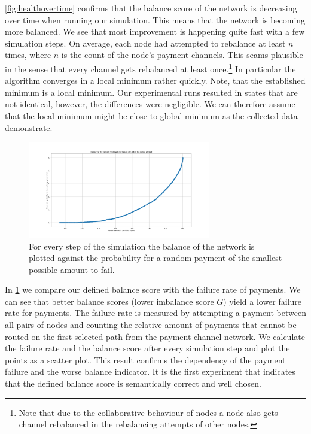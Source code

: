 \documentclass[a4paper]{paper}
\begin{document}
\cref{fig:healthovertime} confirms that the balance score of the network is decreasing over time when running our simulation.
This means that the network is becoming more balanced.
We see that most improvement is happening quite fast with a few simulation steps.
On average, each node had attempted to rebalance at least $n$ times, where $n$ is the count of the node's payment channels.
This seams plausible in the sense that every channel gets rebalanced at least once.\footnote{Note that due to the collaborative behaviour of nodes a node also gets channel rebalanced in the rebalancing attempts of other nodes.} 
In particular the algorithm converges in a local minimum rather quickly.
Note, that the established minimum is a local minimum. 
Our experimental runs resulted in states that are not identical, however, the differences were negligible. 
We can therefore assume that the local minimum might be close to global minimum as the collected data demonstrate.

\begin{figure}
 \centering
 \includegraphics[width=8cm]{code/results/routabilityTest/health vs payment rate.png}
 \caption{For every step of the simulation the balance of the network is plotted against the probability for a random payment of the smallest possible amount to fail.}
 \label{fig:healthVsFailurerate}
\end{figure}

In \cref{fig:healthVsFailurerate} we compare our defined balance score with the failure rate of payments.
We can see that better balance scores (lower imbalance score $G$) yield a lower failure rate for payments.
The failure rate is measured by attempting a payment between all pairs of nodes and counting the relative amount of payments that cannot be routed on the first selected path from the payment channel network.
We calculate the failure rate and the balance score after every simulation step and plot the points as a scatter plot.
This result confirms the dependency of the payment failure and the worse balance indicator. It is the first experiment that indicates that the defined balance score is semantically correct and well chosen. 
\end{document}
